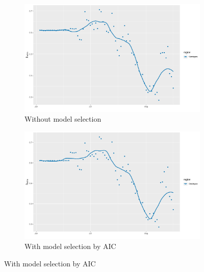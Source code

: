 \documentclass[12pt]{article}
\begin{document}
\begin{appendices}
		\begin{figure}[H]
    	    \centering
    	    \begin{subfigure}{\textwidth}
    	      \centering
    	      \includegraphics[width=0.95\linewidth]{output/model1_lag3_betawithin_Isole_rolling.pdf}
    	      \caption{Without model selection}
    	      \label{fig:beta_within_over_time_isole_regular}
    	    \end{subfigure}\newline
    	    \begin{subfigure}{\textwidth}
    	      \centering
    	      \includegraphics[width=0.95\linewidth]{output/model1_lag3_betawithin_Isole_aic_rolling.pdf}
    	      \caption{With model selection by AIC}
    	      \label{fig:beta_within_over_time_isole_aic}
    	    \end{subfigure}
    	\end{figure}
        \begin{figure}[H]\ContinuedFloat
    	    \begin{subfigure}{\textwidth}
    	      \centering

\end{subfigure}
\end{figure}
\end{appendices}
\end{document}
